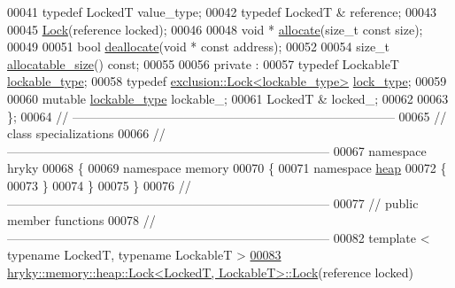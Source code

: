 \begin{DoxyCode}
00041     \textcolor{keyword}{typedef} LockedT                         value\_type;
00042     \textcolor{keyword}{typedef} LockedT &                       reference;
00043 
00045     \hyperlink{classhryky_1_1memory_1_1heap_1_1_lock_aea44137ee10e27ac7ff10e3752571117}{Lock}(reference locked);
00046 
00048     \textcolor{keywordtype}{void} * \hyperlink{classhryky_1_1memory_1_1heap_1_1_lock_a5c1c6735480076daff287d98769b9735}{allocate}(\textcolor{keywordtype}{size\_t} \textcolor{keyword}{const} size);
00049 
00051     \textcolor{keywordtype}{bool} \hyperlink{classhryky_1_1memory_1_1heap_1_1_lock_a221ea34d7afea6045f84df3b1fa77b24}{deallocate}(\textcolor{keywordtype}{void} * \textcolor{keyword}{const} address);
00052 
00054     \textcolor{keywordtype}{size\_t} \hyperlink{classhryky_1_1memory_1_1heap_1_1_lock_a469a43b261f5b0dc3ce2a78c7df31e2b}{allocatable_size}() \textcolor{keyword}{const};
00055 
00056 \textcolor{keyword}{private} :
00057     \textcolor{keyword}{typedef} LockableT                       \hyperlink{classhryky_1_1exclusion_1_1_recursive_mutex}{lockable_type};
00058     \textcolor{keyword}{typedef} \hyperlink{classhryky_1_1exclusion_1_1_lock}{exclusion::Lock<lockable_type>}  \hyperlink{classhryky_1_1exclusion_1_1_lock}{lock_type};
00059 
00060     \textcolor{keyword}{mutable} \hyperlink{classhryky_1_1exclusion_1_1_recursive_mutex}{lockable_type}   lockable\_;
00061     LockedT &               locked\_;
00062 
00063 \};
00064 \textcolor{comment}{//
      ------------------------------------------------------------------------------}
00065 \textcolor{comment}{// class specializations}
00066 \textcolor{comment}{//
      ------------------------------------------------------------------------------}
00067 \textcolor{keyword}{namespace }hryky
00068 \{
00069 \textcolor{keyword}{namespace }memory
00070 \{
00071 \textcolor{keyword}{namespace }\hyperlink{namespacehryky_1_1memory_1_1global_a6fc6103f67c837aa0f39b359588409cd}{heap}
00072 \{
00073 \}
00074 \}
00075 \}
00076 \textcolor{comment}{//
      ------------------------------------------------------------------------------}
00077 \textcolor{comment}{// public member functions}
00078 \textcolor{comment}{//
      ------------------------------------------------------------------------------}
00082 \textcolor{comment}{}\textcolor{keyword}{template} < \textcolor{keyword}{typename} LockedT, \textcolor{keyword}{typename} LockableT >
\hypertarget{memory__heap__lock_8h_source_l00083}{}\hyperlink{classhryky_1_1memory_1_1heap_1_1_lock_aea44137ee10e27ac7ff10e3752571117}{00083} \hyperlink{classhryky_1_1memory_1_1heap_1_1_lock_aea44137ee10e27ac7ff10e3752571117}{hryky::memory::heap::Lock<LockedT, LockableT>::Lock}(reference locked)

\end{DoxyCode}
